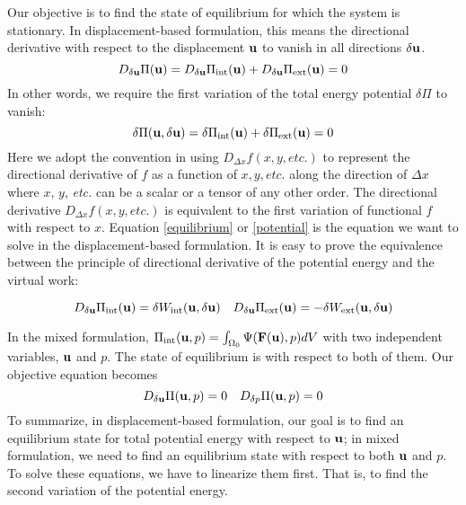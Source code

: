 Our objective is to find the state of equilibrium for which the system is stationary. In displacement-based formulation, this means the directional derivative with respect to the displacement $\bold{u}$ to vanish in all directions $\delta{\bold{u}}$.
\begin{equation} \label{equilibrium}
D_{\delta\bold{u}}\Pi(\bold{u}) = D_{\delta\bold{u}}\Pi_\mathrm{int}(\bold{u}) + D_{\delta\bold{u}}\Pi_\mathrm{ext}(\bold{u}) = 0
\end{equation} 
In other words, we require the first variation of the total energy potential $\delta\Pi$ to vanish:
\begin{equation} \label{potential}
\delta\Pi(\bold{u}, \delta\bold{u}) =\delta\Pi_\mathrm{int}(\bold{u}) + \delta\Pi_\mathrm{ext}(\bold{u}) = 0
\end{equation}
Here we adopt the convention in \cite{Holzapfel} using $D_{\Delta{x}}f(x, y, \textit{etc.})$ to represent the directional derivative of $f$ as a function of $x, y, \textit{etc.}$ along the direction of $\Delta{x}$ where $x$, $y$, \textit{etc.} can be a scalar or a tensor of any other order. The directional derivative $D_{\Delta{x}}f(x, y, \textit{etc.})$ is equivalent to the first variation of functional $f$ with respect to $x$.
Equation \ref{equilibrium} or \ref{potential} is the equation we want to solve in the displacement-based formulation. It is easy to prove the equivalence between the principle of directional derivative of the potential energy and the virtual work:

\begin{equation}
D_{\delta\bold{u}}\Pi_\mathrm{int}(\bold{u}) = \delta W_\mathrm{int}(\bold{u}, \delta\bold{u}) \quad
D_{\delta\bold{u}}\Pi_\mathrm{ext}(\bold{u}) = - \delta W_\mathrm{ext}(\bold{u}, \delta\bold{u})
\end{equation}

In the mixed formulation, $\Pi_\mathrm{int}(\bold{u}, p) = \int_{\Omega_{0}}\Psi(\bold{F}(\bold{u}), p)dV$ with two independent variables, $\bold{u}$ and $p$. The state of equilibrium is with respect to both of them. Our objective equation becomes
\begin{equation} \label{target}
D_{\delta\bold{u}}\Pi(\bold{u}, p) = 0 \quad D_{\delta{p}}\Pi(\bold{u}, p) = 0
\end{equation}
To summarize, in displacement-based formulation, our goal is to find an equilibrium state for total potential energy with respect to $\bold{u}$; in mixed formulation, we need to find an equilibrium state with respect to both $\bold{u}$ and $p$. To solve these equations, we have to linearize them first. That is, to find the second variation of the potential energy.



